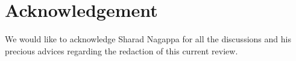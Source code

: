 \section{Acknowledgement} \label{sec:acknowledgement}

We would like to acknowledge Sharad Nagappa for all the discussions and his precious advices regarding the redaction of this current review.
